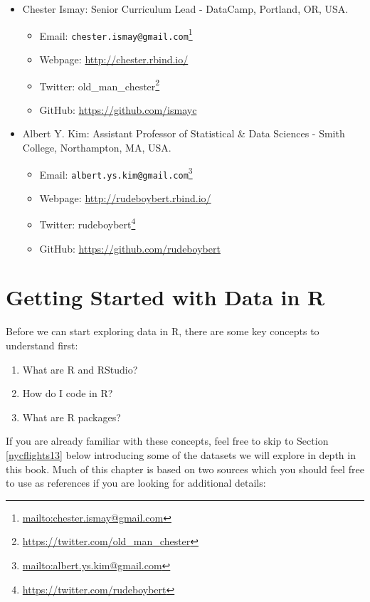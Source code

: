 \documentclass[12pt,]{krantz}
\providecommand{\tightlist}{%
  \setlength{\itemsep}{0pt}\setlength{\parskip}{0pt}}
\renewcommand{\href}[2]{#2\footnote{\url{#1}}}
\begin{document}
\begin{itemize}
\tightlist
\item
  Chester Ismay: Senior Curriculum Lead - DataCamp, Portland, OR, USA.

  \begin{itemize}
  \tightlist
  \item
    Email:
    \href{mailto:chester.ismay@gmail.com}{\nolinkurl{chester.ismay@gmail.com}}
  \item
    Webpage: \url{http://chester.rbind.io/}
  \item
    Twitter:
    \href{https://twitter.com/old_man_chester}{old\_man\_chester}
  \item
    GitHub: \url{https://github.com/ismayc}
  \end{itemize}
\item
  Albert Y. Kim: Assistant Professor of Statistical \& Data Sciences -
  Smith College, Northampton, MA, USA.

  \begin{itemize}
  \tightlist
  \item
    Email:
    \href{mailto:albert.ys.kim@gmail.com}{\nolinkurl{albert.ys.kim@gmail.com}}
  \item
    Webpage: \url{http://rudeboybert.rbind.io/}
  \item
    Twitter: \href{https://twitter.com/rudeboybert}{rudeboybert}
  \item
    GitHub: \url{https://github.com/rudeboybert}
  \end{itemize}
\end{itemize}

\chapter{Getting Started with Data in R}\label{getting-started}

Before we can start exploring data in R, there are some key concepts to
understand first:

\begin{enumerate}
\def\labelenumi{\arabic{enumi}.}
\tightlist
\item
  What are R and RStudio?
\item
  How do I code in R?
\item
  What are R packages?
\end{enumerate}

If you are already familiar with these concepts, feel free to skip to
Section \ref{nycflights13} below introducing some of the datasets we
will explore in depth in this book. Much of this chapter is based on two
sources which you should feel free to use as references if you are
looking for additional details:
\end{document}
